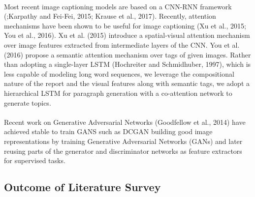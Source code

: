 \documentclass[12pt]{article}
\numberwithin{figure}{section}
\begin{document}
\paragraph{}
Most recent image captioning models are based on a CNN-RNN framework (\cite{4};Karpathy and Fei-Fei, 2015\cite{5}; Krause et al., 2017\cite{6}). Recently, attention mechanisms have been shown to be useful for image captioning (Xu et al., 2015\cite{7}; You et al., 2016\cite{8}). Xu et al. (2015)\cite{7} introduce a spatial-visual attention mechanism over image features extracted from intermediate layers of the CNN. You et al. (2016)\cite{8} propose a semantic attention mechanism over tags of given images. Rather than adopting a single-layer LSTM (Hochreiter and Schmidhuber, 1997)\cite{11}, which is less capable of modeling long word sequences, we leverage the compositional nature of the report and the visual features along with semantic tags, we adopt  a hierarchical LSTM for paragraph generation with a co-attention network to generate topics. 
\paragraph{}
Recent work on Generative Adversarial Networks (Goodfellow et al., 2014)\cite{9} have achieved stable to train GANS such as DCGAN \cite{10} building good image representations by training Generative Adversarial Networks (GANs) and later reusing parts of the generator and discriminator networks as feature extractors for supervised tasks. 
\paragraph{}


\clearpage
\subsection{Outcome of Literature Survey}
\end{document}
